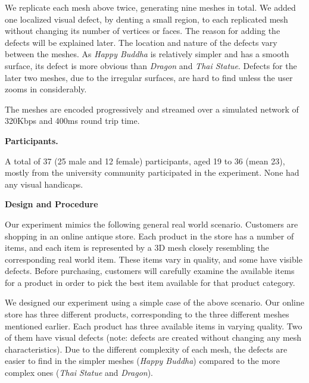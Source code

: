 We replicate each mesh above twice, generating nine meshes in total.  
We added one localized visual defect, by denting a small region, to each replicated mesh 
without changing its number of vertices or faces. The reason for adding the defects will be explained later. 
The location and nature of the
defects vary between the meshes. As \textit{Happy Buddha} is
relatively simpler and has a smooth surface, its defect is
 more obvious than \textit{Dragon}
and \textit{Thai Statue}.  Defects for the later two meshes, due to the
irregular surfaces, are hard to find unless the user zooms in
considerably.

The meshes are encoded progressively and streamed over a simulated network of 320Kbps and 400ms round trip time.  

\textbf{Participants.}

A total of 37 (25 male and 12 female) participants, aged 19 to 36
(mean 23), mostly from the university community participated in the
experiment. None had any visual handicaps.

\textbf{Design and Procedure}

Our experiment mimics the following general real world scenario. Customers
are shopping in an online antique store. Each product in the store has a
number of items, and each item is represented by a 3D mesh closely resembling
the corresponding real world item. These items vary in quality, and some
have visible defects. Before purchasing, customers will carefully examine the
available items for a product in order to pick the best item available for
that product category.

We designed our experiment using a simple case of the above scenario. 
Our online store has three different products,
corresponding to the three different meshes mentioned earlier. Each product
has three available items in varying quality. Two of them have visual
defects (note: defects are created without changing any mesh
characteristics). Due to the different complexity of each mesh, the defects
are easier to find in the simpler meshes (\textit{Happy Buddha}) compared to the more
complex ones (\textit{Thai Statue} and \textit{Dragon}).

